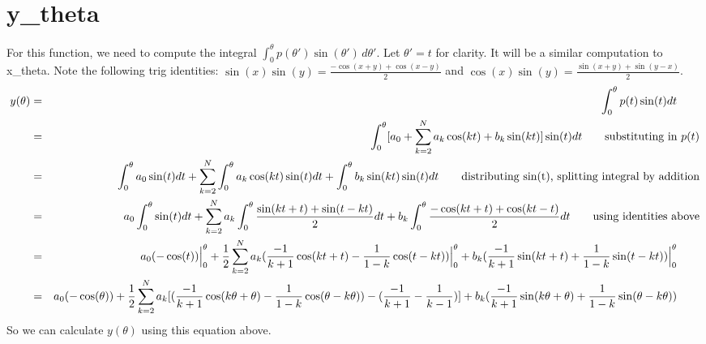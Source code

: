 \documentclass{article}
\begin{document}
\section*{y\_theta}
For this function, we need to compute the integral $\int_{0}^{\theta} p(\theta')\sin(\theta') \,d\theta'$. Let $\theta'=t$ for clarity. It will be a similar computation to x\_theta. Note the following trig identities: $\sin(x)\sin(y)=\frac{-\cos(x+y)+\cos(x-y)}{2}$ and $\cos(x)\sin(y)=\frac{\sin(x+y)+\sin(y-x)}{2}$.
\begin{eqnarray*}
     y(\theta)
      & = & \int_0^\theta p(t)\sin(t)dt
            ~~~~~~ \mbox{\rm } \\
      & = & \int_0^\theta [a_0 +\sum_{k=2}^{N} a_k\cos(kt)+b_k\sin(kt)]\sin(t)dt
            ~~~~~~ \mbox{\rm substituting in $p(t)$} \\
      & = & \int_0^\theta a_0\sin(t)dt +\sum_{k=2}^{N} \int_0^\theta a_k\cos(kt)\sin(t)dt+ \int_0^\theta b_k\sin(kt)\sin(t)dt
            ~~~~~~ \mbox{\rm distributing sin(t), splitting integral by addition} \\
      & = & a_0\int_0^\theta \sin(t)dt +\sum_{k=2}^{N} a_k\int_0^\theta \frac{\sin(kt+t)+\sin(t-kt)}{2}dt+ b_k\int_0^\theta \frac{-\cos(kt+t)+\cos(kt-t)}{2} dt
            ~~~~~~ \mbox{\rm using identities above} \\
      & = & a_0 (-\cos(t))\Big|_0^\theta +\frac{1}{2}\sum_{k=2}^{N} a_k(\frac{-1}{k+1}\cos(kt+t)-\frac{1}{1-k}\cos(t-kt))\Big|_0^\theta+ b_k(\frac{-1}{k+1}\sin(kt+t)+\frac{1}{1-k}\sin(t-kt))\Big|_0^\theta
            ~~~~~~ \mbox{\rm } \\
      & = & a_0 (-\cos(\theta)) +\frac{1}{2}\sum_{k=2}^{N} a_k[(\frac{-1}{k+1}\cos(k\theta+\theta)-\frac{1}{1-k}\cos(\theta-k\theta))-(\frac{-1}{k+1}-\frac{1}{k-1})]+ b_k(\frac{-1}{k+1}\sin(k\theta+\theta)+\frac{1}{1-k}\sin(\theta-k\theta))
            ~~~~~~ \mbox{\rm } \\
\end{eqnarray*}
So we can calculate $y(\theta)$ using this equation above.

\newpage
\end{document}
